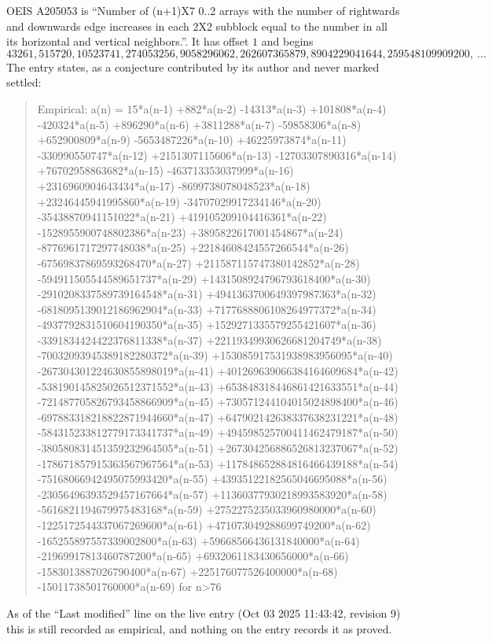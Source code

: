 \documentclass[11pt,a4paper]{article}
\theoremstyle{plain}
\theoremstyle{definition}
\begin{document}
OEIS A205053 is ``Number of (n+1)X7 0..2 arrays with the number of rightwards and downwards edge increases in each 2X2 subblock equal to the number in all its horizontal and vertical neighbors.''. It has offset $1$ and begins
\[
43261, 515720, 10523741, 274053256, 9058296062, 262607365879, 8904229041644, 259548109909200,\ \dots
\]
The entry states, as a conjecture contributed by its author and never marked settled:
\begin{quote}
Empirical: a(n) = 15*a(n-1) +882*a(n-2) -14313*a(n-3) +101808*a(n-4) -420324*a(n-5) +896290*a(n-6) +3811288*a(n-7) -59858306*a(n-8) +652900809*a(n-9) -5653487226*a(n-10) +46225973874*a(n-11) -330990550747*a(n-12) +2151307115606*a(n-13) -12703307890316*a(n-14) +76702958863682*a(n-15) -463713353037999*a(n-16) +2316960904643434*a(n-17) -8699738078048523*a(n-18) +23246445941995860*a(n-19) -34707029917234146*a(n-20) -35438870941151022*a(n-21) +419105209104416361*a(n-22) -1528955900748802386*a(n-23) +3895822617001454867*a(n-24) -8776961717297748038*a(n-25) +22184608424557266544*a(n-26) -67569837869593268470*a(n-27) +211587115747380142852*a(n-28) -594911505544589651737*a(n-29) +1431508924796793618400*a(n-30) -2910208337589739164548*a(n-31) +4941363700649397987363*a(n-32) -6818095139012186962904*a(n-33) +7177688806108264977372*a(n-34) -4937792831510604190350*a(n-35) +1529271335579255421607*a(n-36) -3391834424422376811338*a(n-37) +22119349930626681204749*a(n-38) -70032093945389182280372*a(n-39) +153085917531938983956095*a(n-40) -267304301224630855898019*a(n-41) +401269639066384164609684*a(n-42) -538190145825026512371552*a(n-43) +653848318446861421633551*a(n-44) -721487705826793458866909*a(n-45) +730571244104015024898400*a(n-46) -697883318218822871944660*a(n-47) +647902142638337638231221*a(n-48) -584315233812779173341737*a(n-49) +494598525700411462479187*a(n-50) -380580831451359232964505*a(n-51) +267304256886526813237067*a(n-52) -178671857915363567967564*a(n-53) +117848652884816466439188*a(n-54) -75168066942495075993420*a(n-55) +43935122182565046695088*a(n-56) -23056496393529457167664*a(n-57) +11360377930218993583920*a(n-58) -5616821194679975483168*a(n-59) +2752275235033960980000*a(n-60) -1225172544337067269600*a(n-61) +471073049288699749200*a(n-62) -165255897557339002800*a(n-63) +59668566436131840000*a(n-64) -21969917813460787200*a(n-65) +6932061183430656000*a(n-66) -1583013887026790400*a(n-67) +225176077526400000*a(n-68) -15011738501760000*a(n-69) for n>76
\end{quote}
As of the ``Last modified'' line on the live entry (Oct 03 2025 11:43:42, revision 9) this is still
recorded as empirical, and nothing on the entry records it as proved.
\end{document}
